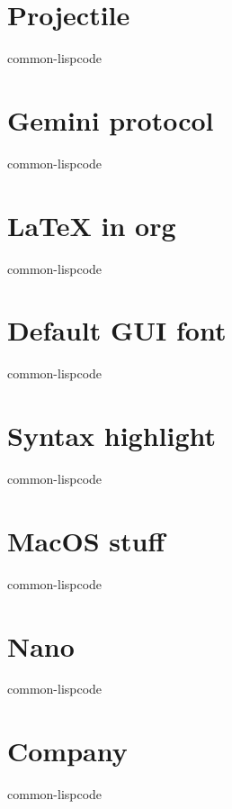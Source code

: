 \documentclass[11pt]{article}
\begin{document}
\section{Projectile}
\label{sec:orgb0198a3}
common-lispcode
\section{Gemini protocol}
\label{sec:orgb8a26ed}
common-lispcode
\section{\LaTeX{} in org}
\label{sec:org9b6c946}
common-lispcode
\section{Default GUI font}
\label{sec:org321213f}
common-lispcode
\section{Syntax highlight}
\label{sec:org6bdcad9}
common-lispcode
\section{MacOS stuff}
\label{sec:orgdc729ba}
common-lispcode
\section{Nano}
\label{sec:org107fe33}
common-lispcode
\section{Company}
\label{sec:org1f0960b}
common-lispcode
\end{document}
